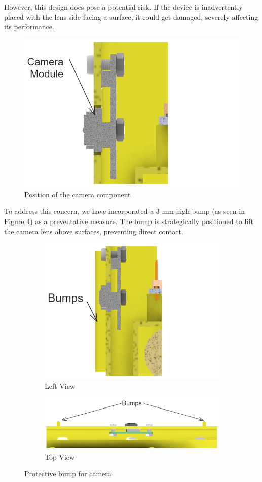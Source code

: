 However, this design does pose a potential risk. If the device is inadvertently placed with the lens side facing a surface, it could get damaged, severely affecting its performance.

\begin{figure}[!ht]
    \centering
    \includegraphics[height=5 cm]{texs/Part1/chapter4/image/d1.png}
    \caption{Position of the camera component}
    \label{fig:camera_position}
\end{figure}

To address this concern, we have incorporated a 3 mm high bump (as seen in Figure \ref{fig:detail_camera_protect}) as a preventative measure. The bump is strategically positioned to lift the camera lens above surfaces, preventing direct contact.

\begin{figure}[!ht]
    \centering
    \begin{subfigure}[c]{0.47\textwidth}
        \begin{minipage}{\textwidth}
            \centering
            \includegraphics[height=4 cm]{texs/Part1/chapter4/image/d12.png}
        \end{minipage}
        \caption{Left View}
        \label{fig:detail_camera_left}
    \end{subfigure}
    \begin{subfigure}[c]{\textwidth}
        \begin{minipage}{\textwidth}
            \centering
            \includegraphics[width=0.75\linewidth]{texs/Part1/chapter4/image/d13.png}
        \end{minipage}
        \caption{Top View}
        \label{fig:detail_camera_top}
    \end{subfigure}
    \caption{Protective bump for camera}
    \label{fig:detail_camera_protect}
\end{figure}

